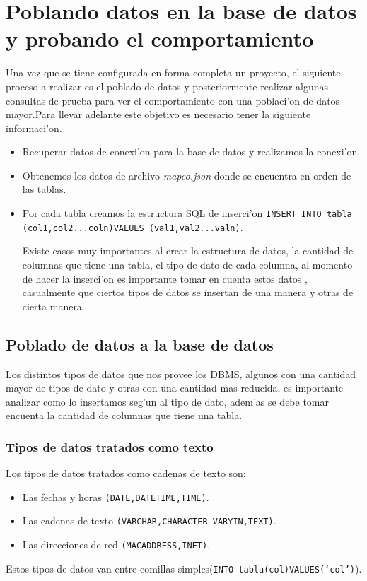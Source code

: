 \chapter{Poblando datos en la base de datos y probando el comportamiento}
Una vez que se tiene configurada en forma completa un proyecto, el siguiente proceso a realizar es el poblado de datos y posteriormente realizar algunas consultas de prueba para ver el comportamiento con una poblaci'on de datos mayor.Para llevar adelante este objetivo es necesario tener la siguiente informaci'on. 
\begin{itemize}
\item Recuperar datos de conexi'on para la base de datos y realizamos la conexi'on.
\item Obtenemos los datos de archivo \textit{mapeo.json} donde se encuentra en orden de las tablas.
\item Por cada tabla creamos la estructura SQL de inserci'on \texttt{INSERT INTO tabla (col1,col2...coln)VALUES (val1,val2...valn)}.

Existe casos muy importantes al crear la estructura de datos, la cantidad de columnas que tiene una tabla, el tipo de dato de cada columna, al momento de hacer la inserci'on es importante tomar en cuenta estos datos , casualmente que ciertos tipos de datos se insertan de una manera y  otras de cierta manera.   
\end{itemize} 
\section{Poblado de datos a la base de datos}
Los distintos tipos de datos que nos provee los DBMS, algunos con una cantidad mayor de tipos de dato y otras con una cantidad mas reducida, es importante analizar como lo insertamos seg'un al tipo de dato, adem'as se debe tomar encuenta la cantidad de columnas que tiene una tabla.
\subsection{Tipos de datos tratados como texto}
Los tipos de datos tratados como cadenas de texto son:
\begin{itemize}
\item Las fechas y horas \texttt{(DATE,DATETIME,TIME)}.
\item Las cadenas de texto \texttt{(VARCHAR,CHARACTER VARYIN,TEXT)}.
\item Las direcciones de red \texttt{(MACADDRESS,INET)}.
\end{itemize}
Estos tipos de datos van entre comillas simples(\texttt{INTO tabla(col)VALUES(`col')}).
